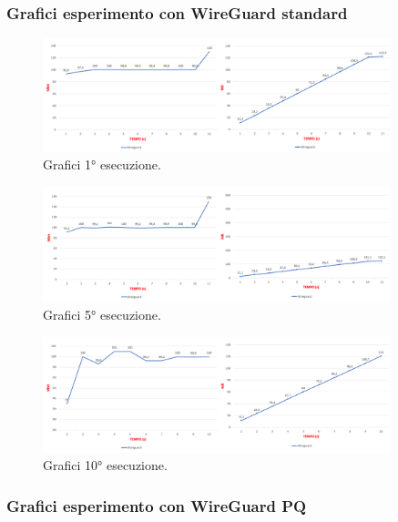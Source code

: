 \newpage
\subsubsection{Grafici esperimento con WireGuard standard}

\begin{figure}[h] \includegraphics[width=0.9\textwidth] {Tesi magistrale/capitoli/images/30.png}
\centering
\caption{Grafici 1° esecuzione.}
\end{figure}

\begin{figure}[h] \includegraphics[width=0.9\textwidth] {Tesi magistrale/capitoli/images/31.png}
\centering
\caption{Grafici 5° esecuzione.}
\end{figure}

\begin{figure}[h] \includegraphics[width=0.9\textwidth] {Tesi magistrale/capitoli/images/32.png}
\centering
\caption{Grafici 10° esecuzione.}
\end{figure}

\newpage
\subsubsection{Grafici esperimento con WireGuard PQ}

